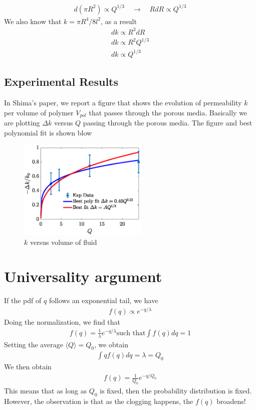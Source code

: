 %
\begin{align}
  d (\pi R^2) \propto Q^{1/3} \quad \to \quad R dR \propto Q^{1/3}
\end{align}
%
We also know that $k = \pi R^4/8l^2$, as a result
%
\begin{align}
  dk \propto R^{3} dR \\
  dk \propto R^2 Q^{1/3} \\
  dk \propto Q^{1/3}
\end{align}

\subsection*{Experimental Results}
%
In Shima's paper, we report a figure that shows the evolution of
permeability $k$ per volume of polymer $V_{pol}$ that passes through
the porous media. Basically we are plotting $\Delta k$ versus $Q$
passing through the porous media. The figure and best polynomial fit
is shown blow
%
%
\begin{figure}[h]
  \centering
  \includegraphics[width=0.55\textwidth]{./Figs/k-evolution.eps}
  \caption{$k$ versus volume of fluid}
\end{figure}





\newpage
\newpage
\newpage






\section{Universality argument}

If the pdf of $q$ follows an exponential tail, we have
%
\begin{align}
  f(q) \propto e^{-q/\lambda}
\end{align}
%
Doing the normalization, we find that
%
\begin{align}
  f(q) = \frac{1}{\lambda} e^{-q/\lambda} \text{such that} \int f(q) dq = 1
\end{align}
%
Setting the average $\langle Q \rangle = Q_0$, we obtain
%
\begin{align}
  \int q f(q) dq = \lambda = Q_{0}
\end{align}
%
We then obtain
%
\begin{align}
  f(q) = \frac{1}{Q_{0}} e^{-q/Q_0}
\end{align}
%
This means that as long as $Q_0$ is fixed, then the probability
distribution is fixed. However, the observation is that as the
clogging happens, the $f(q)$ broadens! 

